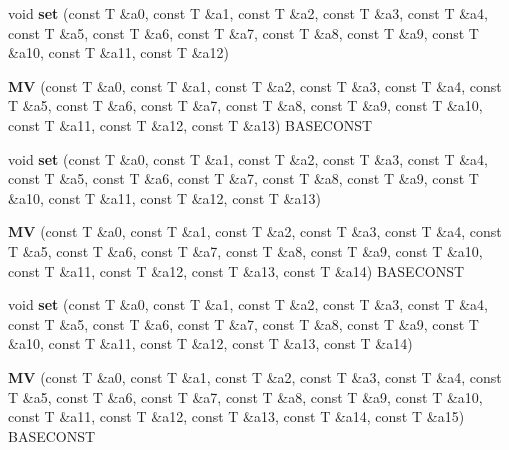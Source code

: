 \begin{DoxyCompactItemize}
\item 
\hypertarget{classvsr_1_1_m_v_a4dc0172abd075b47f56172900a416c3f}{void {\bfseries set} (const T \&a0, const T \&a1, const T \&a2, const T \&a3, const T \&a4, const T \&a5, const T \&a6, const T \&a7, const T \&a8, const T \&a9, const T \&a10, const T \&a11, const T \&a12)}\label{classvsr_1_1_m_v_a4dc0172abd075b47f56172900a416c3f}

\item 
\hypertarget{classvsr_1_1_m_v_ab946257ec742547428059c3c74d13850}{{\bfseries M\-V} (const T \&a0, const T \&a1, const T \&a2, const T \&a3, const T \&a4, const T \&a5, const T \&a6, const T \&a7, const T \&a8, const T \&a9, const T \&a10, const T \&a11, const T \&a12, const T \&a13) B\-A\-S\-E\-C\-O\-N\-S\-T}\label{classvsr_1_1_m_v_ab946257ec742547428059c3c74d13850}

\item 
\hypertarget{classvsr_1_1_m_v_a6b4696c562d27ec3e6d130c820d3d879}{void {\bfseries set} (const T \&a0, const T \&a1, const T \&a2, const T \&a3, const T \&a4, const T \&a5, const T \&a6, const T \&a7, const T \&a8, const T \&a9, const T \&a10, const T \&a11, const T \&a12, const T \&a13)}\label{classvsr_1_1_m_v_a6b4696c562d27ec3e6d130c820d3d879}

\item 
\hypertarget{classvsr_1_1_m_v_a639d74c41c154029c8cea2f9dc7dbec7}{{\bfseries M\-V} (const T \&a0, const T \&a1, const T \&a2, const T \&a3, const T \&a4, const T \&a5, const T \&a6, const T \&a7, const T \&a8, const T \&a9, const T \&a10, const T \&a11, const T \&a12, const T \&a13, const T \&a14) B\-A\-S\-E\-C\-O\-N\-S\-T}\label{classvsr_1_1_m_v_a639d74c41c154029c8cea2f9dc7dbec7}

\item 
\hypertarget{classvsr_1_1_m_v_a1cb2b9d09466586c5bace03f56f1469c}{void {\bfseries set} (const T \&a0, const T \&a1, const T \&a2, const T \&a3, const T \&a4, const T \&a5, const T \&a6, const T \&a7, const T \&a8, const T \&a9, const T \&a10, const T \&a11, const T \&a12, const T \&a13, const T \&a14)}\label{classvsr_1_1_m_v_a1cb2b9d09466586c5bace03f56f1469c}

\item 
\hypertarget{classvsr_1_1_m_v_ac136f8141aa7e5fddbf7de12cbcacd01}{{\bfseries M\-V} (const T \&a0, const T \&a1, const T \&a2, const T \&a3, const T \&a4, const T \&a5, const T \&a6, const T \&a7, const T \&a8, const T \&a9, const T \&a10, const T \&a11, const T \&a12, const T \&a13, const T \&a14, const T \&a15) B\-A\-S\-E\-C\-O\-N\-S\-T}\label{classvsr_1_1_m_v_ac136f8141aa7e5fddbf7de12cbcacd01}


\end{DoxyCompactItemize}
